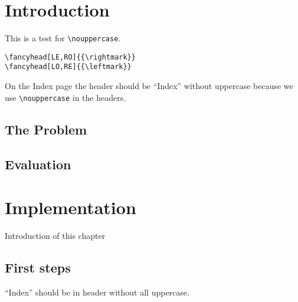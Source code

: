 \documentclass{book}
\begin{document}
\chapter{Introduction}

\begin{boxedminipage}{\textwidth}
This is a test for \verb|\nouppercase|. 
\begin{verbatim}
\fancyhead[LE,RO]{{\rightmark}}
\fancyhead[LO,RE]{{\leftmark}}
\end{verbatim}
On the Index page the header should be ``Index'' without uppercase because we use \verb|\nouppercase| in the headers.
\end{boxedminipage}

\section{The Problem}
\label{sec:problem}

\lipsum[1]

\section{Evaluation}

\lipsum[2]

\chapter{Implementation}

Introduction of this chapter

\lipsum[3]

\section{First steps}
\label{sec:first-steps}

\lipsum
\printindex
\newpage
``Index'' should be in header without all uppercase.
\end{document}
